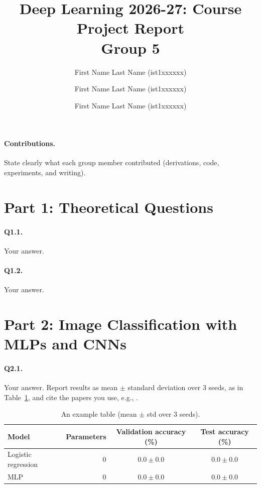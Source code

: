 \documentclass[11pt,a4paper]{article}
\title{Deep Learning 2026-27: Course Project Report \\ \large Group 5}
\author{
  First Name Last Name (ist1xxxxxx) \and
  First Name Last Name (ist1xxxxxx) \and
  First Name Last Name (ist1xxxxxx)
}
\date{}
\begin{document}
\maketitle

\paragraph{Contributions.}
State clearly what each group member contributed (derivations, code, experiments, and writing).

\section*{Part 1: Theoretical Questions}

\paragraph{Q1.1.} Your answer.

\paragraph{Q1.2.} Your answer.


\section*{Part 2: Image Classification with MLPs and CNNs}

\paragraph{Q2.1.}
Your answer. Report results as mean $\pm$ standard deviation over 3 seeds, as in Table~\ref{tab:example}, and cite the papers you use, e.g., \citet{vinyals2015show}.

\begin{table}[ht]
\centering
\begin{tabular}{lrcc}
\toprule
Model & Parameters & Validation accuracy (\%) & Test accuracy (\%) \\
\midrule
Logistic regression & 0 & $0.0 \pm 0.0$ & $0.0 \pm 0.0$ \\
MLP & 0 & $0.0 \pm 0.0$ & $0.0 \pm 0.0$ \\
\bottomrule
\end{tabular}
\caption{An example table (mean $\pm$ std over 3 seeds).}
\label{tab:example}
\end{table}

\end{document}

